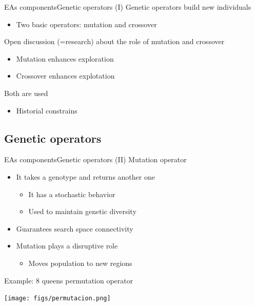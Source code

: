 \documentclass[10pt,compress]{beamer} %
\begin{document}
\begin{frame}{EAs components}{Genetic operators (I)} 
	Genetic operators build new individuals
	\begin{itemize}
		\item Two basic operators: \alert{mutation} and \alert{crossover}
	\end{itemize}
	
	Open discussion (=research) about the role of mutation and crossover
	\begin{itemize}
		\item Mutation enhances exploration
		\item Crossover enhances explotation
	\end{itemize}

	Both are used
	\begin{itemize}
		\item Historial constrains
	\end{itemize}
\end{frame}

\subsection{Genetic operators}

\begin{frame}{EAs components}{Genetic operators (II)} 
	Mutation operator
	\begin{itemize}
		\item It takes a genotype and returns another one
		\begin{itemize}
			\item It has a stochastic behavior
			\item Used to maintain genetic diversity
		\end{itemize}
		\item Guarantees search space connectivity 
		\item Mutation plays a disruptive role
		\begin{itemize}
			\item Moves population to new regions
		\end{itemize}
	\end{itemize}
	
	Example: 8 queens permutation operator
	\begin{center}
		\texttt{[image: figs/permutacion.png]}
	\end{center}
\end{frame}
\end{document}
